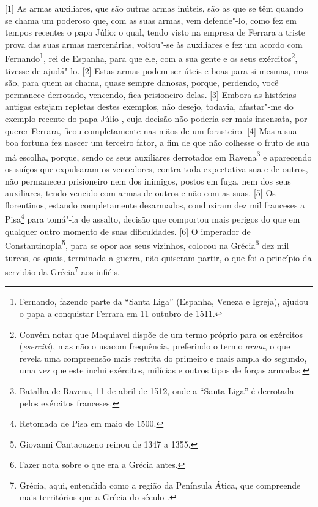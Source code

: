 {[}1{]} As armas auxiliares, que são outras armas inúteis, são as que se
têm quando se chama um poderoso que, com as suas armas, vem defende"-lo,
como fez em tempos recentes o papa Júlio: o qual, tendo visto na empresa
de Ferrara a triste prova das suas armas mercenárias, voltou"-se às
auxiliares e fez um acordo com Fernando\footnote{Fernando, fazendo parte
  da ``Santa Liga'' (Espanha, Veneza e Igreja), ajudou o papa a
  conquistar Ferrara em 11 outubro de 1511.}, rei de Espanha, para que
ele, com a sua gente e os seus exércitos\footnote{Convém notar que
  Maquiavel dispõe de um termo próprio para os exércitos
  (\emph{eserciti}), mas não o usacom frequência, preferindo o termo
  \emph{arma}, o que revela uma compreensão mais restrita do primeiro e
  mais ampla do segundo, uma vez que este inclui exércitos, milícias e
  outros tipos de forças armadas.}, tivesse de ajudá"-lo. {[}2{]} Estas
armas podem ser úteis e boas para si mesmas, mas são, para quem as
chama, quase sempre danosas, porque, perdendo, você permanece derrotado,
vencendo, fica prisioneiro delas. {[}3{]} Embora as histórias antigas
estejam repletas destes exemplos, não desejo, todavia, afastar"-me do
exemplo recente do papa Júlio , cuja decisão não poderia ser mais
insensata, por querer Ferrara, ficou completamente nas mãos de um
forasteiro. {[}4{]} Mas a sua boa fortuna fez nascer um terceiro fator,
a fim de que não colhesse o fruto de sua má escolha, porque, sendo os
seus auxiliares derrotados em Ravena\footnote{Batalha de Ravena, 11 de
  abril de 1512, onde a ``Santa Liga'' é derrotada pelos exércitos
  franceses.} e aparecendo os suíços que expulsaram os vencedores,
contra toda expectativa sua e de outros, não permaneceu prisioneiro nem
dos inimigos, postos em fuga, nem dos seus auxiliares, tendo vencido com
armas de outros e não com as suas. {[}5{]} Os florentinos, estando
completamente desarmados, conduziram dez mil franceses a Pisa\footnote{Retomada
  de Pisa em maio de 1500.} para tomá"-la de assalto, decisão que
comportou mais perigos do que em qualquer outro momento de suas
dificuldades. {[}6{]} O imperador de Constantinopla\footnote{Giovanni 
  Cantacuzeno reinou de 1347 a 1355.}, para se opor aos seus vizinhos,
colocou na Grécia\footnote{Fazer nota sobre o que era a Grécia antes.}
dez mil turcos, os quais, terminada a guerra, não quiseram partir, o que
foi o princípio da servidão da Grécia\footnote{Grécia, aqui, entendida
  como a região da Península Ática, que compreende mais territórios que
  a Grécia do século .} aos infiéis.

